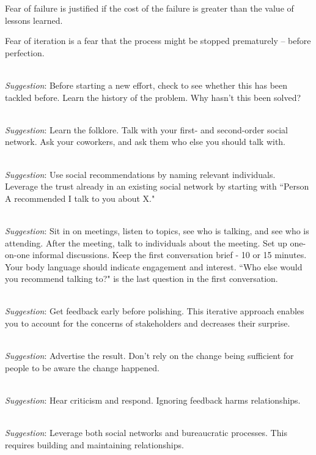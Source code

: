 Fear of failure is justified if the cost of the failure is greater than the value of lessons learned.

Fear of iteration is a fear that the process might be stopped prematurely -- before perfection.

\ \\
\textit{Suggestion}: Before starting a new effort, check to see whether this has been tackled before.
%
%
Learn the history of the problem. Why hasn't this been solved?

\ \\
\textit{Suggestion}: Learn the folklore. Talk with your first- and second-order social network.
Ask your coworkers, and ask them who else you should talk with.

\ \\
\textit{Suggestion}: Use social recommendations by naming relevant individuals.\\
Leverage the trust already in an existing social network by starting with ``Person A recommended I talk to you about X."


\ \\
\textit{Suggestion}: Sit in on meetings, listen to topics, see who is talking, and see who is attending. After the meeting, talk to individuals about the meeting. Set up one-on-one informal discussions. Keep the first conversation brief - 10 or 15 minutes. Your body language should indicate engagement and interest. ``Who else would you recommend talking to?" is the last question in the first conversation.

\ \\
\textit{Suggestion}: Get feedback early before polishing. This iterative approach enables you to account for the concerns of stakeholders and decreases their surprise.

\ \\
\textit{Suggestion}: Advertise the result. Don't rely on the change being sufficient for people to be aware the change happened.

\ \\
\textit{Suggestion}: Hear criticism and respond. Ignoring feedback harms relationships.

\ \\
\textit{Suggestion}: Leverage both social networks and bureaucratic processes. This requires building and maintaining relationships. 

